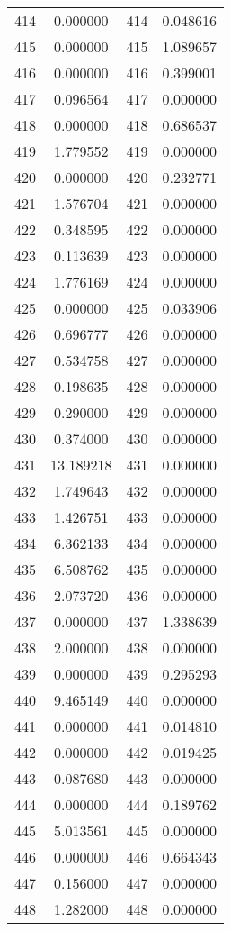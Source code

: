 \documentclass[12pt]{article}
\begin{document}
\begin{longtable}{@{}cccc@{}}
414 & 0.000000 & 414 & 0.048616 \\
415 & 0.000000 & 415 & 1.089657 \\
416 & 0.000000 & 416 & 0.399001 \\
417 & 0.096564 & 417 & 0.000000 \\
418 & 0.000000 & 418 & 0.686537 \\
419 & 1.779552 & 419 & 0.000000 \\
420 & 0.000000 & 420 & 0.232771 \\
421 & 1.576704 & 421 & 0.000000 \\
422 & 0.348595 & 422 & 0.000000 \\
423 & 0.113639 & 423 & 0.000000 \\
424 & 1.776169 & 424 & 0.000000 \\
425 & 0.000000 & 425 & 0.033906 \\
426 & 0.696777 & 426 & 0.000000 \\
427 & 0.534758 & 427 & 0.000000 \\
428 & 0.198635 & 428 & 0.000000 \\
429 & 0.290000 & 429 & 0.000000 \\
430 & 0.374000 & 430 & 0.000000 \\
431 & 13.189218 & 431 & 0.000000 \\
432 & 1.749643 & 432 & 0.000000 \\
433 & 1.426751 & 433 & 0.000000 \\
434 & 6.362133 & 434 & 0.000000 \\
435 & 6.508762 & 435 & 0.000000 \\
436 & 2.073720 & 436 & 0.000000 \\
437 & 0.000000 & 437 & 1.338639 \\
438 & 2.000000 & 438 & 0.000000 \\
439 & 0.000000 & 439 & 0.295293 \\
440 & 9.465149 & 440 & 0.000000 \\
441 & 0.000000 & 441 & 0.014810 \\
442 & 0.000000 & 442 & 0.019425 \\
443 & 0.087680 & 443 & 0.000000 \\
444 & 0.000000 & 444 & 0.189762 \\
445 & 5.013561 & 445 & 0.000000 \\
446 & 0.000000 & 446 & 0.664343 \\
447 & 0.156000 & 447 & 0.000000 \\
448 & 1.282000 & 448 & 0.000000 \\

\end{longtable}
\end{document}
